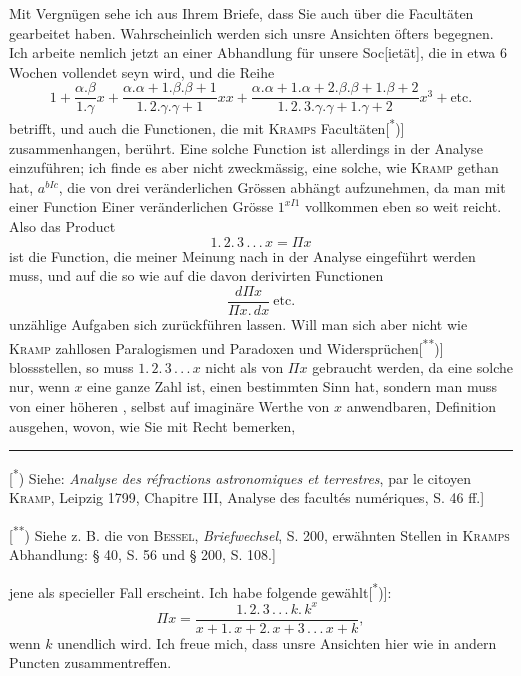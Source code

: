 \clearpage{}
\quad Mit Vergnügen sehe ich aus Ihrem Briefe, dass Sie auch über die Facultäten gearbeitet haben. Wahrscheinlich werden sich unsre Ansichten öfters begegnen. Ich arbeite nemlich jetzt an einer Abhandlung für unsere Soc[ietät], die in etwa 6 Wochen vollendet seyn wird, und die Reihe
{\small
\[
1+\frac{\alpha{.}\beta}{1{.}\gamma}x+\frac{\alpha{.}\alpha+1{.}\beta{.}\beta+1}{1{.}\,2{.}\gamma{.}\gamma+1}xx+\frac{\alpha{.}\alpha+1{.}\alpha+2{.}\beta{.}\beta+1{.}\beta+2}{1{.}\,2{.}\,3{.}\gamma{.}\gamma+1{.}\gamma+2}x^3+\text{etc.}
\]
}
\noindent betrifft, und auch die Functionen, die mit \textsc{Kramps} Facultäten[\textsuperscript{*})] zusammenhangen, berührt. Eine solche Function ist allerdings in der Analyse einzuführen; ich finde es aber nicht zweckmässig, eine solche, wie \textsc{Kramp} gethan hat, $a^{bIc}$, die von drei veränderlichen Grössen abhängt aufzunehmen, da man mit einer Function Einer veränderlichen Grösse $1^{xI1}$ vollkommen eben so weit reicht. Also das Product
\[
1{.}\,2{.}\,3\,{.}\,{.}\,{.}\,x=\Pi x
\]
\noindent ist die Function, die meiner Meinung nach in der Analyse eingeführt werden muss, und auf die so wie auf die davon derivirten Functionen
\[
\frac{d\Pi x}{\Pi x{.}\,dx}\ \text{etc.}
\]
\noindent unzählige Aufgaben sich zurückführen lassen. Will man sich aber nicht wie \textsc{Kramp} zahllosen Paralogismen und Paradoxen und Widersprüchen[\textsuperscript{**})] blossstellen, so muss $1{.}\,2{.}\,3\,{.}\,{.}\,{.}\,x$ nicht als  von $\Pi x$ gebraucht werden, da eine solche nur, wenn $x$ eine ganze Zahl ist, einen bestimmten Sinn hat, sondern man muss von einer höheren , selbst auf imaginäre Werthe von $x$ anwendbaren, Definition ausgehen, wovon, wie Sie mit Recht bemerken,
\par\medskip\noindent\rule{.24\linewidth}{.4pt}\par\smallskip
{\small
\noindent\hspace*{\parindent}[\textsuperscript{*}) Siehe: \textit{Analyse des réfractions astronomiques et terrestres}, par le citoyen \textsc{Kramp}, Leipzig 1799, Chapitre III, Analyse des facultés numériques, S. 46 ff.]
\par\noindent\hspace*{\parindent}[\textsuperscript{**}) Siehe z. B. die von \textsc{Bessel}, \textit{Briefwechsel}, S. 200, erwähnten Stellen in \textsc{Kramps} Abhandlung: § 40, S. 56 und § 200, S. 108.]
\par}
\clearpage{}
\noindent jene als specieller Fall erscheint. Ich habe folgende gewählt[\textsuperscript{*})]:
\[
\Pi x=\frac{1{.}\,2{.}\,3\,{.}\,{.}\,{.}\,k{.}\,k^x}{x+1{.}\,x+2{.}\,x+3\,{.}\,{.}\,{.}\,x+k},
\]
\noindent wenn $k$ unendlich wird. Ich freue mich, dass unsre Ansichten hier wie in andern Puncten zusammentreffen.

